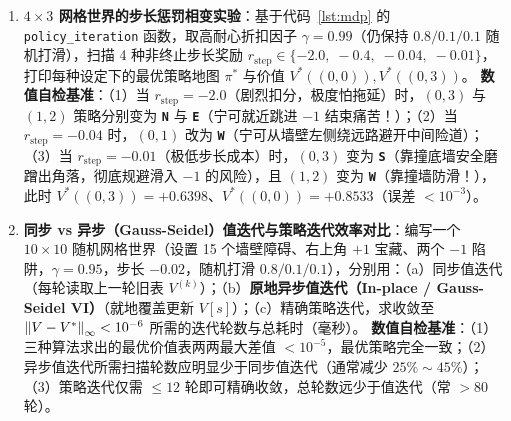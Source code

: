 \begin{enumerate}[label=\textbf{6.\arabic*}, resume]
  \item \textbf{$4\times 3$ 网格世界的步长惩罚相变实验}：基于代码~\ref{lst:mdp} 的 \texttt{policy\_iteration} 函数，取高耐心折扣因子 $\gamma = 0.99$（仍保持 $0.8/0.1/0.1$ 随机打滑），扫描 4 种非终止步长奖励 $r_{\text{step}} \in \{-2.0,\; -0.4,\; -0.04,\; -0.01\}$，打印每种设定下的最优策略地图 $\pi^*$ 与价值 $V^*((0,0)), V^*((0,3))$。
  \textbf{数值自检基准}：（1）当 $r_{\text{step}} = -2.0$（剧烈扣分，极度怕拖延）时，$(0,3)$ 与 $(1,2)$ 策略分别变为 \textbf{\texttt{N}} 与 \textbf{\texttt{E}}（宁可就近跳进 $-1$ 结束痛苦！）；（2）当 $r_{\text{step}} = -0.04$ 时，$(0,1)$ 改为 \textbf{\texttt{W}}（宁可从墙壁左侧绕远路避开中间险道）；（3）当 $r_{\text{step}} = -0.01$（极低步长成本）时，$(0,3)$ 变为 \textbf{\texttt{S}}（靠撞底墙安全磨蹭出角落，彻底规避滑入 $-1$ 的风险），且 $(1,2)$ 变为 \textbf{\texttt{W}}（靠撞墙防滑！），此时 $V^*((0,3)) = +0.6398$、$V^*((0,0)) = +0.8533$（误差 $< 10^{-3}$）。

  \item \textbf{同步 vs 异步（Gauss-Seidel）值迭代与策略迭代效率对比}：编写一个 $10 \times 10$ 随机网格世界（设置 15 个墙壁障碍、右上角 $+1$ 宝藏、两个 $-1$ 陷阱，$\gamma = 0.95$，步长 $-0.02$，随机打滑 $0.8/0.1/0.1$），分别用：（a）同步值迭代（每轮读取上一轮旧表 $V^{(k)}$）；（b）\textbf{原地异步值迭代（In-place / Gauss-Seidel VI）}（就地覆盖更新 $V[s]$）；（c）精确策略迭代，求收敛至 $\left\|V - V^*\right\|_\infty < 10^{-6}$ 所需的迭代轮数与总耗时（毫秒）。
  \textbf{数值自检基准}：（1）三种算法求出的最优价值表两两最大差值 $< 10^{-5}$，最优策略完全一致；（2）异步值迭代所需扫描轮数应明显少于同步值迭代（通常减少 $25\%\sim 45\%$）；（3）策略迭代仅需 $\le 12$ 轮即可精确收敛，总轮数远少于值迭代（常 $> 80$ 轮）。
\end{enumerate}
